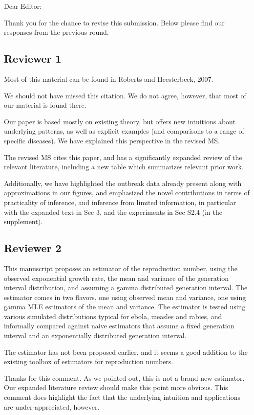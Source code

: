 \documentclass[12pt]{article}
\newcommand{\rev}{\subsection*}
\newcommand{\revtext}{\textsf}
\begin{document}
\noindent Dear Editor:

Thank you for the chance to revise this submission. Below please find our responses from the previous round.

\rev{Reviewer 1}

\revtext{Most of this material can be found in Roberts and Heesterbeek, 2007.}

We should not have missed this citation. We do not agree, however, that most of our material is found there.

Our paper is based mostly on existing theory, but offers new intuitions about underlying patterns, as well as explicit examples (and comparisons to a range of specific diseases). We have explained this perspective in the revised MS.

The revised MS cites this paper, and has a significantly expanded review of the relevant literature, including a new table which summarizes relevant prior work.

Additionally, we have highlighted the outbreak data already present along with approximations in our figures, and emphasized the novel contributions in terms of practicality of inference, and inference from limited information, in particular with the expanded text in Sec 3, and the experiments in Sec S2.4 (in the supplement).

\rev{Reviewer 2}

\revtext{This manuscript proposes an estimator of the reproduction number, using the observed exponential growth rate, the mean and variance of the generation interval distribution, and assuming a gamma distributed generation interval. The estimator comes in two flavors, one using observed mean and variance, one using gamma MLE estimators of the mean and variance. The estimator is tested using various simulated distributions typical for ebola, measles and rabies, and informally compared against naive estimators that assume a fixed generation interval and an exponentially distributed generation interval.}

\revtext{The estimator has not been proposed earlier, and it seems a good addition to the existing toolbox of estimators for reproduction numbers.}

Thanks for this comment. As we pointed out, this is not a brand-new estimator. Our expanded literature review should make this point more obvious. This comment does highlight the fact that the underlying intuition and applications are under-appreciated, however.
\end{document}
